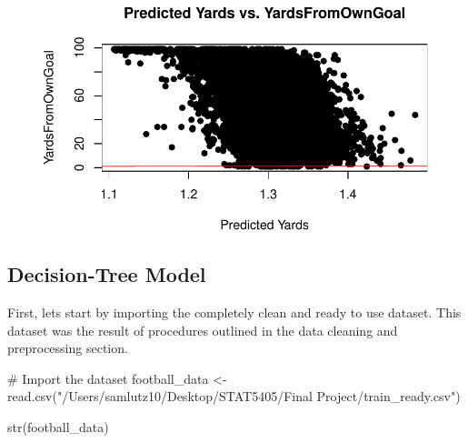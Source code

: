 \documentclass[
  super,
  preprint,
  3p]{elsarticle}
\newenvironment{Shaded}{\begin{snugshade}}{\end{snugshade}}
\newcommand{\CommentTok}[1]{\textcolor[rgb]{0.37,0.37,0.37}{#1}}
\newcommand{\FunctionTok}[1]{\textcolor[rgb]{0.28,0.35,0.67}{#1}}
\newcommand{\NormalTok}[1]{\textcolor[rgb]{0.00,0.23,0.31}{#1}}
\newcommand{\OtherTok}[1]{\textcolor[rgb]{0.00,0.23,0.31}{#1}}
\newcommand{\StringTok}[1]{\textcolor[rgb]{0.13,0.47,0.30}{#1}}
\begin{document}
\begin{figure}[H]

{\centering \includegraphics{project_report_files/figure-pdf/unnamed-chunk-42-1.pdf}

}

\end{figure}

\hypertarget{decision-tree-model}{%
\subsection{Decision-Tree Model}\label{decision-tree-model}}

First, lets start by importing the completely clean and ready to use
dataset. This dataset was the result of procedures outlined in the data
cleaning and preprocessing section.

\begin{Shaded}
\begin{Highlighting}[]
\CommentTok{\# Import the dataset}
\NormalTok{football\_data }\OtherTok{\textless{}{-}} \FunctionTok{read.csv}\NormalTok{(}\StringTok{"/Users/samlutz10/Desktop/STAT5405/Final Project/train\_ready.csv"}\NormalTok{)}

\FunctionTok{str}\NormalTok{(football\_data)}
\end{Highlighting}
\end{Shaded}
\end{document}

